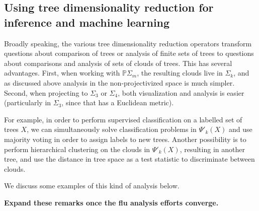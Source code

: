\documentclass[a4paper,11pt]{article}
\begin{document}
\subsection{Using tree dimensionality reduction for inference and machine learning}

Broadly speaking, the various tree dimensionality reduction operators transform questions about comparison of trees or analysis of finite sets of trees to questions about comparisons and analysis of sets of clouds of trees.
This has several advantages.
First, when working with $\mathbb{P}\Sigma_m$, the resulting clouds live in $\Sigma_k$, and as discussed above analysis in the non-projectivized space is much simpler.
Second, when projecting to $\Sigma_3$ or $\Sigma_4$, both visualization and analysis is easier (particularly in $\Sigma_3$, since that has a Euclidean metric).

For example, in order to perform supervised classification on a labelled set of trees $X$, we can simultaneously solve classification problems in $\Psi'_k(X)$ and use majority voting in order to assign labels to new trees.
Another possibility is to perform hierarchical clustering on the clouds in $\Psi'_k(X)$, resulting in another tree, and use the distance in tree space as a test statistic to discriminate between clouds.

We discuss some examples of this kind of analysis below.

{\bf Expand these remarks once the flu analysis efforts converge.}

\end{document}
